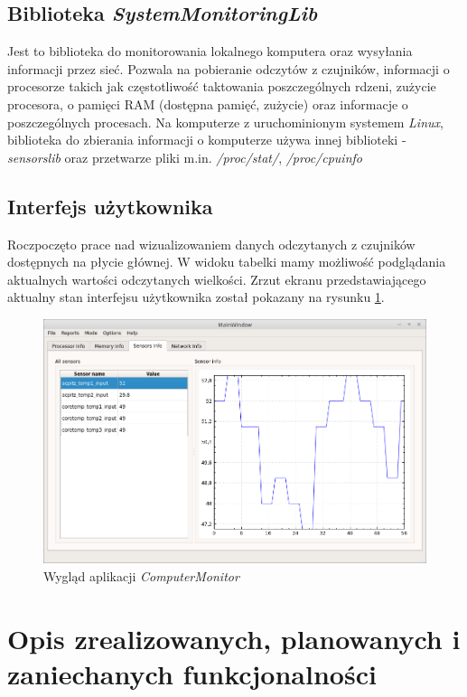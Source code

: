 \documentclass[a4paper]{article}
\begin{document}
\subsection{Biblioteka \textit{SystemMonitoringLib}}
Jest to biblioteka do monitorowania lokalnego komputera oraz wysyłania informacji przez sieć. Pozwala na pobieranie odczytów z czujników, informacji o procesorze takich jak częstotliwość taktowania poszczególnych rdzeni, zużycie procesora, o pamięci RAM (dostępna pamięć, zużycie) oraz informacje o poszczególnych procesach. Na komputerze z uruchominionym systemem \textit{Linux}, biblioteka do zbierania informacji o komputerze używa innej biblioteki - \textit{sensorslib} oraz przetwarze pliki m.in. \textit{/proc/stat/}, \textit{/proc/cpuinfo}

\subsection{Interfejs użytkownika}
Roczpoczęto prace nad wizualizowaniem danych  odczytanych z czujników dostępnych na płycie głównej.
W widoku tabelki mamy możliwość podglądania aktualnych wartości odczytanych wielkości. Zrzut ekranu przedstawiającego aktualny stan interfejsu użytkownika został pokazany na rysunku \ref{wygladAplikacji}.

\begin{figure}[h]
	\centering
	\includegraphics[width=\linewidth]{img/wygladAplikacji.png}
	\caption{Wygląd aplikacji \textit{ComputerMonitor}}
	\label{wygladAplikacji}
\end{figure}

\section{Opis zrealizowanych, planowanych i zaniechanych funkcjonalności}
\end{document}
